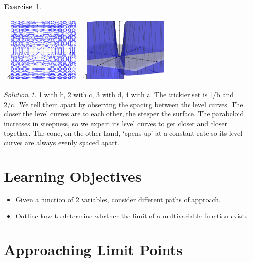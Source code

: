 \documentclass[
]{book}
\providecommand{\tightlist}{%
  \setlength{\itemsep}{0pt}\setlength{\parskip}{0pt}}
\theoremstyle{definition}
\theoremstyle{definition}
\theoremstyle{definition}
\newtheorem{exercise}{Exercise}[chapter]
\theoremstyle{definition}
\theoremstyle{remark}
\newtheorem*{solution}{Solution}
\begin{document}
\begin{exercise}
\begin{longtable}[]{@{}ll@{}}
4\includegraphics[width=\textwidth,height=1.25in]{images/sin-cos.png} & d\includegraphics[width=\textwidth,height=1.25in]{images/hyperboloid-3d.png} \\
\bottomrule
\end{longtable}

\end{exercise}

\begin{solution}

1 with b, 2 with c, 3 with d, 4 with a. The trickier set is 1/b and 2/c.~We tell them apart by observing the spacing between the level curves. The closer the level curves are to each other, the steeper the surface. The paraboloid increases in steepness, so we expect its level curves to get closer and closer together. The cone, on the other hand, `opens up' at a constant rate so its level curves are always evenly spaced apart.

\end{solution}

\hypertarget{learning-objectives-1}{%
\section{Learning Objectives}\label{learning-objectives-1}}

\begin{itemize}
\tightlist
\item
  Given a function of 2 variables, consider different paths of approach.
\item
  Outline how to determine whether the limit of a multivariable function exists.
\end{itemize}

\hypertarget{approaching-limit-points}{%
\section{Approaching Limit Points}\label{approaching-limit-points}}
\end{document}

